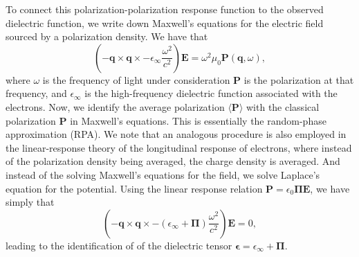 \documentclass[aps,prb,twocolumn,
	groupedaddress,superscriptaddress,
	amsfonts,amssymb,amsmath,floatfix,
	citeautoscript]{revtex4-1}
\begin{document}
To connect this polarization-polarization response function to the observed dielectric function, we write down Maxwell's equations for the electric field sourced by a polarization density. We have that
\begin{equation}
\left(-\mathbf{q}\times\mathbf{q}\times - \epsilon_{\infty}\frac{\omega^2}{c^2} \right)\mathbf{E} = \omega^2\mu_0\mathbf{P}(\mathbf{q},\omega),
\end{equation}
where $\omega$ is the frequency of light under consideration $\mathbf{P}$ is the polarization at that frequency, and $\epsilon_{\infty}$ is the high-frequency dielectric function associated with the electrons. Now, we identify the average polarization $\langle\mathbf{P}\rangle$ with the classical polarization $\mathbf{P}$ in Maxwell's equations. This is essentially the random-phase approximation (RPA). We note that an analogous procedure is also employed in the linear-response theory of the longitudinal response of electrons, where instead of the polarization density being averaged, the charge density is averaged. And instead of the solving Maxwell's equations for the field, we solve Laplace's equation for the potential. Using the linear response relation $\mathbf{P} = \epsilon_0\boldsymbol{\Pi}\mathbf{E}$, we have simply that
\begin{equation}
\left(-\mathbf{q}\times\mathbf{q}\times - \left(\epsilon_{\infty} + \boldsymbol{\Pi} \right)\frac{\omega^2}{c^2}\right)\mathbf{E} = 0,
\end{equation}
leading to the identification of of the dielectric tensor $\boldsymbol{\epsilon} = \epsilon_{\infty} + \boldsymbol{\Pi}$. 
\end{document}
